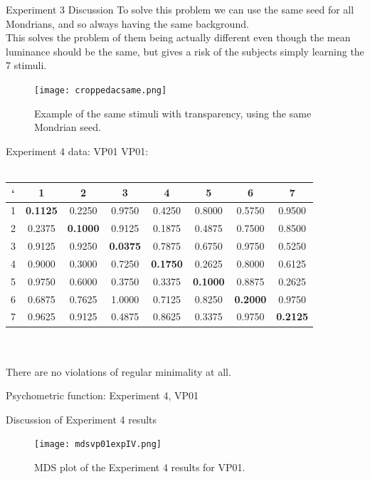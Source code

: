 \documentclass{beamer}
\begin{document}
\begin{frame}[t]{Experiment 3 Discussion}
To solve this problem we can use the same seed for all Mondrians, and so always having the same background. \\This solves the problem of them being actually different even though the mean luminance should be the same, but gives a risk of the subjects simply learning the 7 stimuli.\\

\begin{figure}[c]
\texttt{[image: croppedacsame.png]}
\caption{Example of the same stimuli with transparency, using the same Mondrian seed.}
\end{figure}

\end{frame}

\begin{frame}[t]{Experiment 4 data: VP01}
VP01:\\
~\\
\begin{tabular}{c | c c c c c c c}
` & 1 & 2 & 3 & 4 & 5 & 6 & 7 \\ \hline 
1& {\bf \color{red} 0.1125}& 0.2250& 0.9750& 0.4250& 0.8000& 0.5750& 0.9500\\
2& 0.2375& {\bf \color{red} 0.1000}& 0.9125& 0.1875& 0.4875& 0.7500& 0.8500\\
3& 0.9125& 0.9250& {\bf \color{red} 0.0375}& 0.7875& 0.6750& 0.9750& 0.5250\\
4& 0.9000& 0.3000& 0.7250& {\bf \color{red} 0.1750}& 0.2625& 0.8000& 0.6125\\
5& 0.9750& 0.6000& 0.3750& 0.3375& {\bf \color{red} 0.1000}& 0.8875& 0.2625\\
6& 0.6875& 0.7625& 1.0000& 0.7125& 0.8250& {\bf \color{red} 0.2000}& 0.9750\\
7& 0.9625& 0.9125& 0.4875& 0.8625& 0.3375& 0.9750& {\bf \color{red} 0.2125}\\
\end{tabular}
\\
~\\
There are no violations of regular minimality at all.
\end{frame}

\begin{frame}[t]{Psychometric function: Experiment 4, VP01}
\end{frame}

\begin{frame}[t]{Discussion of Experiment 4 results}
\begin{figure}[c]
\texttt{[image: mdsvp01expIV.png]}
\caption{MDS plot of the Experiment 4 results for VP01.}
\end{figure}
\end{frame}
\end{document}
